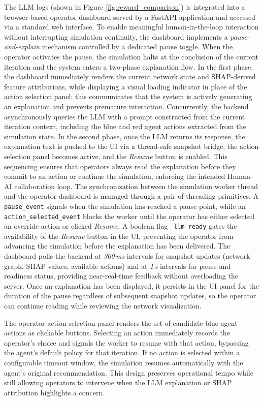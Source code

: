 The LLM logs (shown in Figure \ref{fig:reward_comparison}) is integrated into a browser-based operator dashboard served by a FastAPI application and accessed via a standard web interface. To enable meaningful human-in-the-loop interaction without interrupting simulation continuity, the dashboard implements a \emph{pause-and-explain} mechanism controlled by a dedicated pause toggle. When the operator activates the pause, the simulation halts at the
conclusion of the current iteration and the system enters a two-phase explanation flow. In the first phase, the dashboard immediately renders the current network state and SHAP-derived feature attributions, while displaying a visual loading indicator in place of the action selection panel; this communicates that the system is actively generating an explanation and prevents premature interaction. Concurrently, the
backend asynchronously queries the LLM with a prompt constructed from the current iteration context, including the blue and red agent actions extracted from the simulation state. In the second phase, once the LLM returns its response, the explanation text is pushed to the UI via a thread-safe snapshot bridge, the action selection panel becomes active, and the \emph{Resume} button is enabled. This sequencing ensures that operators always read the explanation before they commit to an action or continue the simulation, enforcing the intended Human-AI collaboration loop.
The synchronization between the simulation worker thread and the operator dashboard is managed through a pair of threading primitives. A \texttt{pause\_event} signals when the simulation has reached a pause point, while an \texttt{action\_selected\_event} blocks the worker until the operator has either selected an override action or clicked \emph{Resume}. A boolean flag \texttt{\_llm\_ready} gates the availability of the \emph{Resume} button in the UI, preventing the operator from advancing the simulation before the explanation has been delivered. The dashboard polls the backend at \textit{300\,ms} intervals for snapshot updates (network graph, SHAP values, available actions) and at \textit{1\,s} intervals for pause and readiness status, providing near-real-time feedback without overloading the server. Once an explanation has been displayed, it persists in the UI panel for the duration of the pause regardless of subsequent snapshot updates, so the operator can continue reading while reviewing the network visualization.

The operator action selection panel renders the set of candidate blue agent actions as clickable buttons. 
Selecting an action immediately records the operator's choice and signals the worker to resume with that action, bypassing the agent's default policy for that iteration. If no action is selected within a configurable timeout window, the simulation resumes automatically with the agent's original recommendation. 
This design preserves operational tempo while still allowing operators to intervene when the LLM explanation or SHAP attribution highlights a concern.

